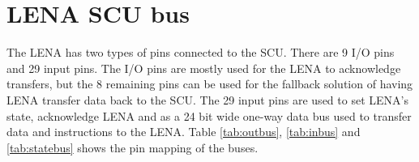\section{LENA SCU bus}
\label{app:lena-scu-bus}

The LENA has two types of pins connected to the SCU. There are 9 I/O pins and 29 input pins. The I/O pins are mostly used for the LENA to acknowledge transfers, but the 8 remaining pins can be used for the fallback solution of having LENA transfer data back to the SCU. The 29 input pins are used to set LENA's state, acknowledge LENA and as a 24 bit wide one-way data bus used to transfer data and instructions to the LENA. Table \ref{tab:outbus}, \ref{tab:inbus} and \ref{tab:statebus} shows the pin mapping of the buses.



